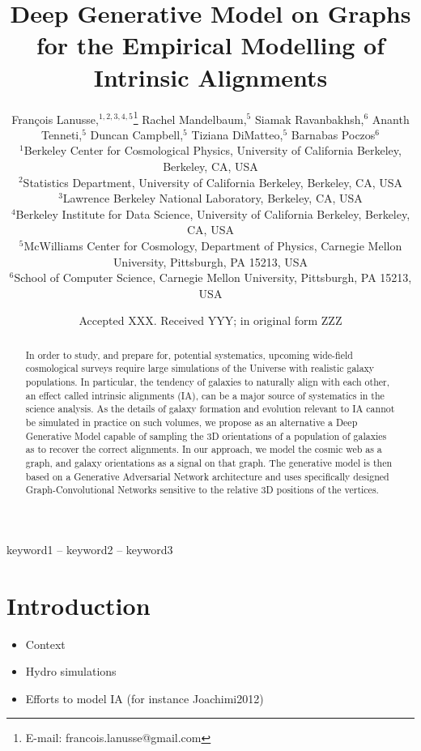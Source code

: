 \documentclass[a4paper,fleqn,usenatbib]{mnras}
\title[Generative model on graphs]{Deep Generative Model on Graphs for the Empirical Modelling of Intrinsic Alignments}
\author[F. Lanusse et al.]{
Fran\c{c}ois Lanusse,$^{1,2,3,4,5}$\thanks{E-mail: francois.lanusse@gmail.com}
Rachel Mandelbaum,$^{5}$
Siamak Ravanbakhsh,$^{6}$
Ananth Tenneti,$^{5}$
\newauthor
Duncan Campbell,$^{5}$
Tiziana DiMatteo,$^{5}$
Barnabas Poczos$^{6}$
\\
$^{1}$Berkeley Center for Cosmological Physics, University of California Berkeley, Berkeley, CA, USA\\
$^{2}$Statistics Department, University of California Berkeley, Berkeley, CA, USA\\
$^{3}$Lawrence Berkeley National Laboratory, Berkeley, CA, USA\\
$^{4}$Berkeley Institute for Data Science, University of California Berkeley, Berkeley, CA, USA\\
$^{5}$McWilliams Center for Cosmology, Department of Physics, Carnegie Mellon University, Pittsburgh, PA 15213, USA\\
$^{6}$School of Computer Science, Carnegie Mellon University, Pittsburgh, PA 15213, USA
}
\date{Accepted XXX. Received YYY; in original form ZZZ}
\begin{document}
\label{firstpage}
\pagerange{\pageref{firstpage}--\pageref{lastpage}}
\maketitle

\begin{abstract}
In order to study, and prepare for, potential systematics, upcoming wide-field cosmological surveys require large simulations of the
Universe with realistic galaxy populations. In particular, the tendency of galaxies to naturally align with each other, an effect called 
intrinsic alignments (IA), can be a major source of systematics in the science analysis. As the details of galaxy formation and evolution relevant
to IA cannot be simulated in practice on such volumes, we propose as an  alternative a Deep Generative Model capable of sampling 
the 3D orientations of a population of galaxies as to recover the correct alignments. In our approach, we model the cosmic 
web as a graph, and galaxy orientations as a signal on that graph. The generative model is then based on a Generative 
Adversarial Network architecture and uses specifically designed Graph-Convolutional Networks sensitive to the relative
3D positions of the vertices.
\end{abstract}

\begin{keywords}
keyword1 -- keyword2 -- keyword3
\end{keywords}



\section{Introduction}

\begin{itemize}
	\item Context
	\item Hydro simulations
	\item Efforts to model IA (for instance Joachimi2012)

\end{itemize}
\end{document}
